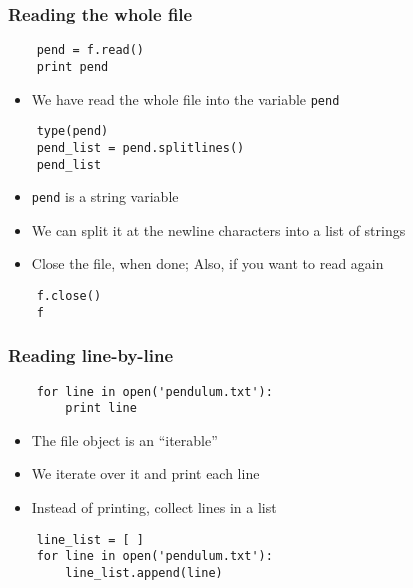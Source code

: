 \begin{frame}[fragile]
  \frametitle{Reading the whole file}
  \begin{lstlisting}
    pend = f.read()
    print pend
  \end{lstlisting}
  \begin{itemize}
  \item We have read the whole file into the variable \texttt{pend}
  \end{itemize}
  \begin{lstlisting}
    type(pend)
    pend_list = pend.splitlines()
    pend_list
  \end{lstlisting}
  \begin{itemize}
  \item  \texttt{pend} is a string variable
  \item We can split it at the newline characters into a list of
    strings
  \item Close the file, when done; Also, if you want to read again
  \end{itemize}
  \begin{lstlisting}
    f.close()
    f
  \end{lstlisting}
\end{frame}

\begin{frame}[fragile]
  \frametitle{Reading line-by-line}
  \begin{lstlisting}
    for line in open('pendulum.txt'):
        print line
  \end{lstlisting}
  \begin{itemize}
  \item The file object is an ``iterable''
  \item We iterate over it and print each line
  \item Instead of printing, collect lines in a list
  \end{itemize}
  \begin{lstlisting}
    line_list = [ ]
    for line in open('pendulum.txt'):
        line_list.append(line)
  \end{lstlisting}
\end{frame}


